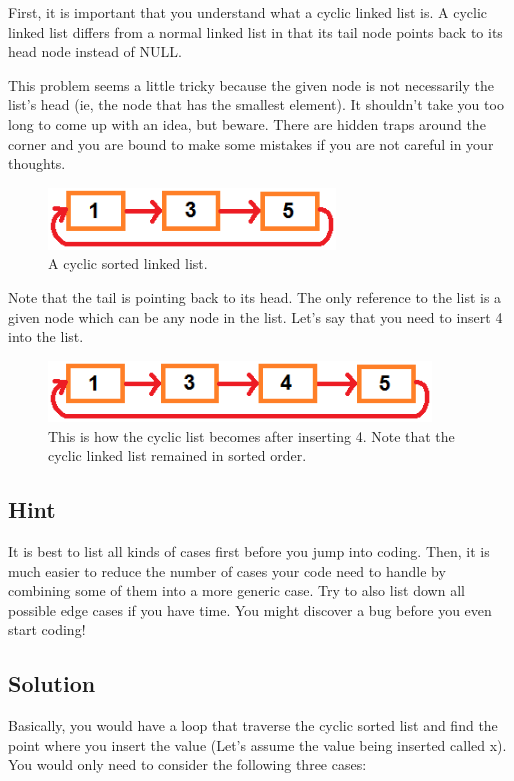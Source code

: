 \documentclass[12pt, reqno, oneside]{amsart}
\begin{document}
First, it is important that you understand what a cyclic linked list is. A cyclic linked list differs from a normal linked list in that its tail node points back to its head node instead of NULL.

This problem seems a little tricky because the given node is not necessarily the list’s head (ie, the node that has the smallest element). It shouldn’t take you too long to come up with an idea, but beware. There are hidden traps around the corner and you are bound to make some mistakes if you are not careful in your thoughts.

\begin{figure}[htbp] %
   \centering
   \includegraphics[width=3in]{figs/cyclic_list1.png} 
   \caption{A cyclic sorted linked list.}
   \label{fig:cyclic_list1}
\end{figure}

Note that the tail is pointing back to its head. The only reference to the list is a given node which can be any node in the list. Let’s say that you need to insert 4 into the list.

\begin{figure}[htbp] %
   \centering
   \includegraphics[width=4in]{figs/cyclic_list2.png} 
   \caption{This is how the cyclic list becomes after inserting 4. Note that the cyclic linked list remained in sorted order.}
   \label{fig:cyclic_list1}
\end{figure}

\subsection{Hint}
It is best to list all kinds of cases first before you jump into coding. Then, it is much easier to reduce the number of cases your code need to handle by combining some of them into a more generic case. Try to also list down all possible edge cases if you have time. You might discover a bug before you even start coding!

\subsection{Solution}
Basically, you would have a loop that traverse the cyclic sorted list and find the point where you insert the value (Let’s assume the value being inserted called x). You would only need to consider the following three cases:
\end{document}
